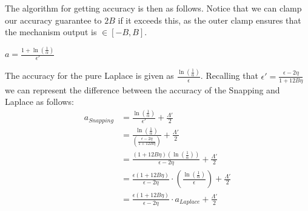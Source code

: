 \documentclass[11pt]{scrartcl} %
\begin{document}
The algorithm for getting accuracy is then as follows. Notice that we can clamp our accuracy guarantee to $2B$ if it
exceeds this, as the outer clamp ensures that the mechanism output is $\in [-B, B]$.
\begin{algorithm}
	\label{GetAccuracy2}
	\begin{algorithmic}
			\State $a = \frac{1 + \ln \left( \frac{1}{\alpha} \right)}{\epsilon'}$
					\State{}
			\Else{}
				\State{}
			\EndIf
		\EndFunction
	\end{algorithmic}
\end{algorithm}

The accuracy for the pure Laplace is given as $\frac{\ln \left( \frac{1}{\alpha} \right)}{\epsilon}$. Recalling that
$\epsilon' = \frac{\epsilon - 2\eta}{1 + 12B\eta}$ we can represent the difference between the accuracy of the
Snapping and Laplace as follows:
\begin{align*}
	a_{Snapping} &= \frac{\ln \left( \frac{1}{\alpha} \right)}{\epsilon'} + \frac{\Lambda'}{2} \\
	&= \frac{\ln \left( \frac{1}{\alpha} \right)}{\left( \frac{\epsilon - 2\eta}{1 + 12B\eta} \right)} + \frac{\Lambda'}{2} \\
	&= \frac{(1 + 12B \eta) \left(\ln \left( \frac{1}{\alpha} \right) \right)}{\epsilon - 2\eta} + \frac{\Lambda'}{2} \\
	&= \frac{\epsilon(1 + 12B \eta)}{\epsilon - 2\eta } \cdot \left(\frac{\ln \left( \frac{1}{\alpha} \right)}{\epsilon} \right) + \frac{\Lambda'}{2} \\
	&= \frac{\epsilon(1 + 12B \eta)}{\epsilon - 2\eta} \cdot a_{Laplace} + \frac{\Lambda'}{2}
\end{align*}
\end{document}
